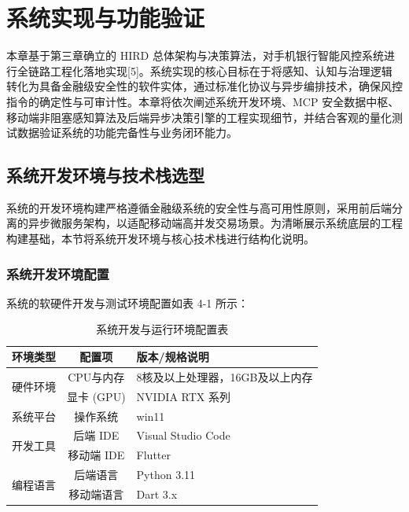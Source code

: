 \documentclass{xduugthesis}
\begin{document}
\chapter{系统实现与功能验证}

本章基于第三章确立的 HIRD 总体架构与决策算法，对手机银行智能风控系统进行全链路工程化落地实现[5]。系统实现的核心目标在于将感知、认知与治理逻辑转化为具备金融级安全性的软件实体，通过标准化协议与异步编排技术，确保风控指令的确定性与可审计性。本章将依次阐述系统开发环境、MCP 安全数据中枢、移动端非阻塞感知算法及后端异步决策引擎的工程实现细节，并结合客观的量化测试数据验证系统的功能完备性与业务闭环能力。

\section{系统开发环境与技术栈选型}

系统的开发环境构建严格遵循金融级系统的安全性与高可用性原则，采用前后端分离的异步微服务架构，以适配移动端高并发交易场景。为清晰展示系统底层的工程构建基础，本节将系统开发环境与核心技术栈进行结构化说明。

\subsection{系统开发环境配置}

系统的软硬件开发与测试环境配置如表 4-1 所示：

\begin{table}[H]
    \centering
    \caption{系统开发与运行环境配置表}
    \label{tab:dev-env}
    \begin{tabular}{|c|c|p{6cm}|}
        \hline
        环境类型 & 配置项 & 版本/规格说明 \\
        \hline
        \multirow{2}{*}{硬件环境} & CPU与内存 & 8核及以上处理器，16GB及以上内存 \\
        \cline{2-3}
        & 显卡 (GPU) & NVIDIA RTX 系列 \\
        \hline
        系统平台 & 操作系统 & win11 \\
        \hline
        \multirow{2}{*}{开发工具} & 后端 IDE & Visual Studio Code\\
        \cline{2-3}
        & 移动端 IDE & Flutter \\
        \hline
        \multirow{2}{*}{编程语言} & 后端语言 & Python 3.11\\
        \cline{2-3}
        & 移动端语言 & Dart 3.x\\
        \hline
    \end{tabular}
\end{table}
\end{document}
